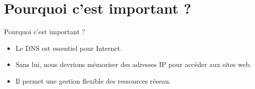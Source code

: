 \documentclass{clbeamer2024}
\begin{document}
	
	\section{Pourquoi c'est important ?}
	\begin{frame}{Pourquoi c'est important ?}
		\begin{itemize}
			\item Le DNS est essentiel pour Internet.
			\item Sans lui, nous devrions mémoriser des adresses IP pour accéder aux sites web.
			\item Il permet une gestion flexible des ressources réseau.
		\end{itemize}
	\end{frame}
	
	
	
\end{document}
